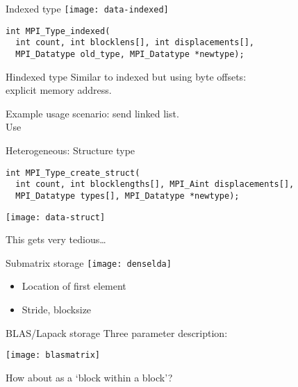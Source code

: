 \begin{exerciseframe}[stridesend]
  
\end{exerciseframe}

\begin{exerciseframe}
  
\end{exerciseframe}

\begin{numberedframe}{Indexed type}
  \texttt{[image: data-indexed]}
\begin{lstlisting}
int MPI_Type_indexed(
  int count, int blocklens[], int displacements[],
  MPI_Datatype old_type, MPI_Datatype *newtype);
\end{lstlisting}
\end{numberedframe}

\begin{numberedframe}{Hindexed type}
  Similar to indexed but using byte offsets:\\
  explicit memory address.

  Example usage scenario: send linked list.\\
  Use 
\end{numberedframe}

\begin{numberedframe}{Heterogeneous: Structure type}
\begin{lstlisting}
int MPI_Type_create_struct(
  int count, int blocklengths[], MPI_Aint displacements[],
  MPI_Datatype types[], MPI_Datatype *newtype);
\end{lstlisting}
  \texttt{[image: data-struct]}

This gets very tedious\ldots
\end{numberedframe}


\begin{numberedframe}{Submatrix storage}
  \texttt{[image: denselda]}

  \begin{itemize}
  \item Location of first element
  \item Stride, blocksize
  \end{itemize}
\end{numberedframe}


\begin{numberedframe}{BLAS/Lapack storage}
  Three parameter description:

  \texttt{[image: blasmatrix]}

  How about as a `block within a block'?
\end{numberedframe}

